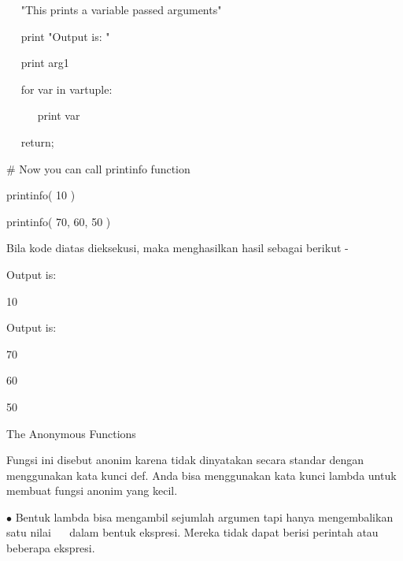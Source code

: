 \noindent 
 \hspace*{0.5in} ~~ "This prints a variable passed arguments" \par
\noindent 
 \hspace*{0.5in} ~~ print "Output is: " \par
\noindent 
 \hspace*{0.5in} ~~ print arg1 \par
\noindent 
 \hspace*{0.5in} ~~ for var in vartuple: \par
\noindent 
 \hspace*{0.5in} ~~~~~ print var \par
\noindent 
 \hspace*{0.5in} ~~ return; \par
\noindent 
 \hspace*{0.5in} \vspace{12pt}
\noindent 
 \hspace*{0.5in}  $  \#  $ Now you can call printinfo function \par
\noindent 
 \hspace*{0.5in} printinfo( 10 ) \par
\noindent 
 \hspace*{0.5in} printinfo( 70, 60, 50 ) \par
\noindent 
Bila kode diatas dieksekusi, maka menghasilkan hasil sebagai berikut - \par
\noindent 
 \hspace*{0.5in} Output is: \par
\noindent 
 \hspace*{0.5in} 10 \par
\noindent 
 \hspace*{0.5in} Output is: \par
\noindent 
 \hspace*{0.5in} 70 \par
\noindent 
 \hspace*{0.5in} 60 \par
\noindent 
 \hspace*{0.5in} 50 \par
\noindent 
The $  $Anonymous $  $Functions \par
\noindent 
Fungsi ini disebut anonim karena tidak dinyatakan secara standar dengan menggunakan kata kunci def. Anda bisa menggunakan kata kunci lambda untuk membuat fungsi anonim yang kecil. \par
\noindent 
 \hspace*{0.5in}  $ \bullet $ Bentuk lambda bisa mengambil sejumlah argumen tapi hanya mengembalikan satu nilai  \hspace*{0.5in} ~~ dalam bentuk ekspresi. Mereka tidak dapat berisi perintah atau beberapa ekspresi. \par
